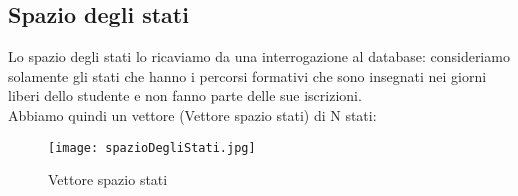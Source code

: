 \documentclass[10pt,a4paper]{article}
\begin{document}
    \subsection{Spazio degli stati}
      \label{spazioDegliStatiSubsection}
      Lo spazio degli stati lo ricaviamo da una interrogazione al database: consideriamo solamente gli stati che hanno i percorsi formativi 
      che sono insegnati nei giorni liberi dello studente e non fanno parte delle sue iscrizioni.\\
      Abbiamo quindi un vettore (Vettore spazio stati) di N stati:\\
      \begin{figure}[h!]
        \centering
        \caption{Vettore spazio stati}
        \texttt{[image: spazioDegliStati.jpg]}
        \label{vettoreStati}
      \end{figure}
      
      \newpage
      
\end{document}
